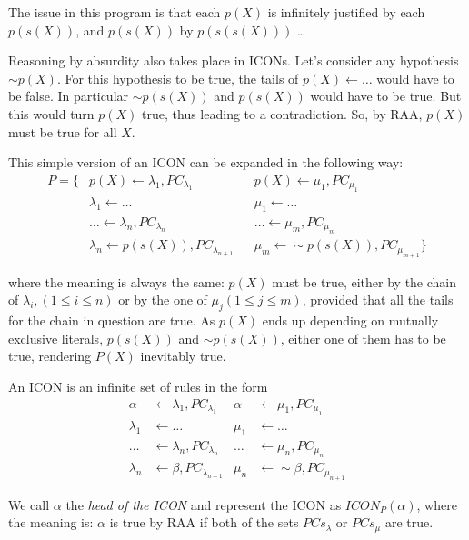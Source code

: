 The issue in this program is that each $p(X)$ is infinitely justified by each $p(s(X))$, and $p(s(X))$ by $p(s(s(X)))$ \ldots

Reasoning by absurdity also takes place in ICONs. Let's consider any hypothesis $\sim p(X)$. For this hypothesis to be true, the tails of $p(X)\leftarrow\ldots$ would have to be false. In particular $\sim p(s(X))$ and $p(s(X))$ would have to be true. But this would turn $p(X)$ true, thus leading to a contradiction. So, by RAA, $p(X)$ must be true for all $X$.

This simple version of an ICON can be expanded in the following way:
\begin{align*}
P=\{
& p(X)\leftarrow \lambda_{1}, PC_{\lambda_{1}}				&			& p(X)\leftarrow \mu_{1}, PC_{\mu_{1}} \\
& \lambda_{1}\leftarrow \ldots												&			& \mu_{1}\leftarrow \ldots \\
& \ldots\leftarrow \lambda_{n}, PC_{\lambda_{n}}			&			& \ldots\leftarrow \mu_{m}, PC_{\mu_{m}} \\
& \lambda_{n}\leftarrow p(s(X)), PC_{\lambda_{n+1}}		&			& \mu_{m}\leftarrow \sim p(s(X)), PC_{\mu_{m+1}} 
\}
\end{align*}

where the meaning is always the same: $p(X)$ must be true, either by the chain of $\lambda_{i}, (1\leq i\leq n)$ or by the one of $\mu_{j} (1\leq j\leq m)$, provided that all the tails for the chain in question are true. As $p(X)$ ends up depending on mutually exclusive literals, $p(s(X))$ and $\sim p(s(X))$, either one of them has to be true, rendering $P(X)$ inevitably true.







\begin{definition}
\label{def:icon}
An ICON is an infinite set of rules in the form 
\begin{align*}
 \alpha &\leftarrow \lambda_{1}, PC_{\lambda_{1}}		&			 \alpha & \leftarrow \mu_{1}, PC_{\mu_{1}} \\
 \lambda_{1} &\leftarrow \ldots											&			 \mu_{1} & \leftarrow \ldots \\
 \ldots &\leftarrow \lambda_{n}, PC_{\lambda_{n}}		&			 \ldots & \leftarrow \mu_{n}, PC_{\mu_{n}} \\
 \lambda_{n}& \leftarrow \beta, PC_{\lambda_{n+1}}	&			 \mu_{n} & \leftarrow \sim \beta, PC_{\mu_{n+1}} 
\end{align*}

We call $\alpha$ the \emph{head of the ICON} and represent the ICON as $ICON_{P}(\alpha)$, where the meaning is: $\alpha$ is true by RAA if both of the sets $PCs_{\lambda}$ or $PCs_{\mu}$ are true.

\end{definition}

